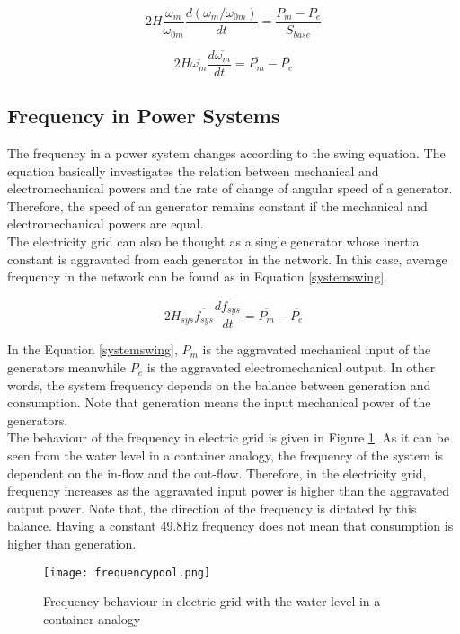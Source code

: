 \begin{equation}
2H\frac{\omega_{m}}{\omega_{0m}}\frac{d(\omega_{m}/\omega_{0m})}{dt}=\frac{P_{m}-P_{e}}{S_{base}}
\label{eqmotion4}
\end{equation}

\begin{equation}
2H\overline{\omega_{m}}\frac{d\overline{\omega_{m}}}{dt}=\overline{P_{m}}-\overline{P_{e}}
\label{eqmotion5}
\end{equation}

\subsection{Frequency in Power Systems}
The frequency in a power system changes according to the swing equation. The equation basically investigates the relation between mechanical and electromechanical powers and the rate of change of angular speed of a generator. Therefore, the speed of an generator remains constant if the mechanical and electromechanical powers are equal.\\
The electricity grid can also be thought as a single generator whose inertia constant is aggravated from each generator in the network. In this case, average frequency in the network can be found as in Equation \ref{systemswing}. 

\begin{equation}
\label{systemswing}
2H_{sys}\overline{f_{sys}}\frac{d\overline{f_{sys}}}{dt}=\overline{P_{m}}-\overline{P_{e}}
\end{equation}

In the Equation \ref{systemswing}, $P_{m}$ is the aggravated mechanical input of the generators meanwhile $P_{e}$ is the aggravated electromechanical output. In other words, the system frequency depends on the balance between generation and consumption. Note that generation means the input mechanical power of the generators. \\
The behaviour of the frequency in electric grid is given in Figure \ref{frequencyingrid}. As it can be seen from the water level in a container analogy, the frequency of the system is dependent on the in-flow and the out-flow. Therefore, in the electricity grid, frequency increases as the aggravated input power is higher than the aggravated output power. Note that, the direction of the frequency is dictated by this balance. Having a constant 49.8Hz frequency does not mean that consumption is higher than generation.

\begin{figure}[h!]
	\centering
	\texttt{[image: frequencypool.png]}
	\caption{Frequency behaviour in electric grid with the water level in a container analogy \cite{Eto2010}}
	\label{frequencyingrid}
\end{figure} 

